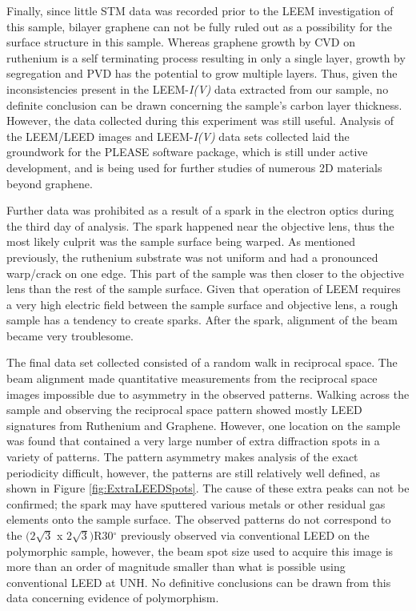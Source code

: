 Finally, since little STM data was recorded prior to the LEEM investigation of this sample, bilayer graphene can not be fully ruled out as a possibility for the surface structure in this sample. Whereas graphene growth by CVD on ruthenium is a self terminating process resulting in only a single layer, growth by segregation and PVD has the potential to grow multiple layers. Thus, given the inconsistencies present in the LEEM-\textit{I(V)} data extracted from our sample, no definite conclusion can be drawn concerning the sample's carbon layer thickness. However, the data collected during this experiment was still useful. Analysis of the LEEM/LEED images and LEEM-\textit{I(V)} data sets collected laid the groundwork for the PLEASE software package, which is still under active development, and is being used for further studies of numerous 2D materials beyond graphene.

Further data was prohibited as a result of a spark in the electron optics during the third day of analysis. The spark happened near the objective lens, thus the most likely culprit was the sample surface being warped. As mentioned previously, the ruthenium substrate was not uniform and had a pronounced warp/crack on one edge. This part of the sample was then closer to the objective lens than the rest of the sample surface. Given that operation of LEEM requires a very high electric field between the sample surface and objective lens, a rough sample has a tendency to create sparks. After the spark, alignment of the beam became very troublesome.

The final data set collected consisted of a random walk in reciprocal space. The beam alignment made quantitative measurements from the reciprocal space images impossible due to asymmetry in the observed patterns. Walking across the sample and observing the reciprocal space pattern showed mostly LEED signatures from Ruthenium and Graphene. However, one location on the sample was found that contained a very large number of extra diffraction spots in a variety of patterns. The pattern asymmetry makes analysis of the exact periodicity difficult, however, the patterns are still relatively well defined, as shown in Figure \ref{fig:ExtraLEEDSpots}. The cause of these extra peaks can not be confirmed; the spark may have sputtered various metals or other residual gas elements onto the sample surface. The observed patterns do not correspond to the $(2\sqrt{3}$ x $2\sqrt{3})$R30$^\circ$ previously observed via conventional LEED on the polymorphic sample, however, the beam spot size used to acquire this image is more than an order of magnitude smaller than what is possible using conventional LEED at UNH. No definitive conclusions can be drawn from this data concerning evidence of polymorphism.

